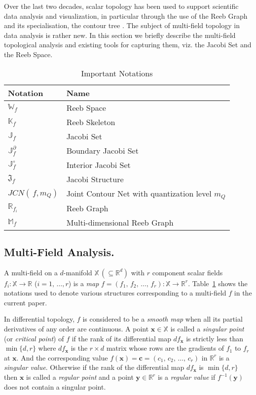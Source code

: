 \documentclass[twocolumn]{article}
\newcommand{\bx}{\mathbf{x}}
\newcommand{\bc}{\mathbf{c}}
\newcommand{\R}{\mathbb{R}}
\newcommand{\Int}[1]{{#1}^{\circ}}
\newcommand{\Bd}[1]{{#1}^{\partial}}
\newcommand{\RS}{\mathbb{W}_f}
\newcommand{\JS}{\mathfrak{J}_f}
\newcommand{\Ji}{\Int{\mathbb{J}}_f}
\newcommand{\Jb}{\Bd{\mathbb{J}}_f}
\newcommand{\Jf}{\mathbb{J}_f}
\newcommand{\JCN}[2]{JCN#1\,#2}
\newcommand{\MDRG}{\mathbb{M}_f}
\newcommand{\RG}{\mathbb{R}_{f_i}}
\newcommand{\RK}{\mathbb{K}_f}
\begin{document}
Over the last two decades, scalar topology has been used to support scientific data analysis and visualization,
in particular through the use of the Reeb Graph and its
specialisation, the contour tree \cite{1997-Kreveld-CT,
  2000-Carr-CT, 2001-Hilaga, 2004-edels-timevarying, 2007-Pascucci}.
The subject of multi-field topology in data analysis is
rather new. In this section we briefly describe the multi-field
topological analysis and existing tools for capturing them, viz. the
Jacobi Set and the Reeb Space.

\begin{table}[h!]
 \begin{center}
 \caption{Important Notations}
\begin{tabular}{ll}
\hline
\textbf{Notation}        &  \textbf{Name} \\ 
\hline 
$\RS$ & 	          Reeb Space\\
$\RK$ &            Reeb Skeleton\\
$\Jf$  &             Jacobi Set\\
$\Jb$ &             Boundary Jacobi Set\\
$\Ji$  &             Interior Jacobi Set \\
$\JS$ &             Jacobi Structure\\
$\JCN(f, m_Q)$ &          Joint Contour Net with quantization
              level $m_Q$\\
$\RG$ &           Reeb Graph\\
$\MDRG$&       Multi-dimensional Reeb Graph\\
\hline
\end{tabular}
\label{tab:notations}
\end{center}
\end{table}

\subsection*{Multi-Field Analysis.}
A multi-field on a $d$-manifold $\mathbb{X}\, (\subseteq\mathbb{R}^d)$ with $r$ component scalar fields
$f_i:\mathbb{X}\rightarrow \mathbb{R}$ ($i=1,\,\ldots, r$) is a \textit{map} $f=(f_1,\,f_2,\,\ldots,\,f_r): \mathbb{X}\rightarrow
\mathbb{R}^r$. Table~\ref{tab:notations} shows the notations used to denote
various structures corresponding to a multi-field $f$ in the current paper. 


In differential topology, $f$ is considered to be a \textit{smooth map} when all its partial derivatives of any order
are continuous. A point $\bx\in \mathbb{X}$ is called a \textit{singular point} (or
\textit{critical point}) of $f$ if the
rank of its differential map $df_{\bx}$ is strictly less than $\min\{d,
r\}$ where $df_{\bx}$ is the $r \times d$ matrix whose rows are the
gradients of $f_1$ to $f_r$ at $\bx$. And the corresponding
value $f(\bx)=\bc=(c_1,\, c_2,\, \ldots,\, c_r)$ in $\mathbb{R}^r$ is a \textit{singular
value}. Otherwise if the rank of the differential map $df_{\bx}$ is $\min\{d,
r\}$ then $\bx$  is called a \textit{regular point} and a point $\mathbf{y}\in \R^r$
 is a \textit{regular value} if $f^{-1}(\mathbf{y})$ does not contain
 a singular point. 
\end{document}
